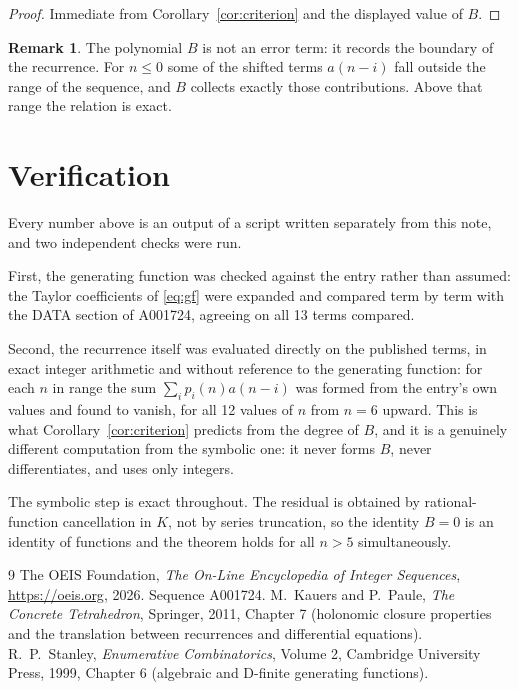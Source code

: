 \documentclass[11pt,a4paper]{article}
\theoremstyle{plain}
\theoremstyle{definition}
\newtheorem{remark}[theorem]{Remark}
\begin{document}
\begin{proof}
Immediate from Corollary~\ref{cor:criterion} and the displayed value of $B$.
\end{proof}

\begin{remark}
The polynomial $B$ is not an error term: it records the boundary of the recurrence. For
$n\le0$ some of the shifted terms $a(n-i)$ fall outside the range of the sequence,
and $B$ collects exactly those contributions. Above that range the relation is exact.
\end{remark}

\section{Verification}

Every number above is an output of a script written separately from this note, and two
independent checks were run.

First, the generating function was checked against the entry rather than assumed: the
Taylor coefficients of \eqref{eq:gf} were expanded and compared term by term with the DATA
section of A001724, agreeing on all 13 terms compared.

Second, the recurrence itself was evaluated directly on the published terms, in exact
integer arithmetic and without reference to the generating function: for each $n$ in range
the sum $\sum_{i}p_{i}(n)a(n-i)$ was formed from the entry's own values and found to
vanish, for all 12 values of $n$ from $n=6$ upward. This is what
Corollary~\ref{cor:criterion} predicts from the degree of $B$, and it is a genuinely
different computation from the symbolic one: it never forms $B$, never differentiates, and
uses only integers.

The symbolic step is exact throughout. The residual is obtained by rational-function
cancellation in $K$, not by series truncation, so the identity $B=0$ is an
identity of functions and the theorem holds for all $n>5$ simultaneously.

\begin{thebibliography}{9}
 The OEIS Foundation, \emph{The On-Line Encyclopedia of Integer Sequences},
\url{https://oeis.org}, 2026. Sequence A001724.
 M.~Kauers and P.~Paule, \emph{The Concrete Tetrahedron}, Springer, 2011,
Chapter 7 (holonomic closure properties and the translation between recurrences and
differential equations).
 R.~P.~Stanley, \emph{Enumerative Combinatorics}, Volume 2, Cambridge
University Press, 1999, Chapter 6 (algebraic and D-finite generating functions).
\end{thebibliography}
\end{document}
